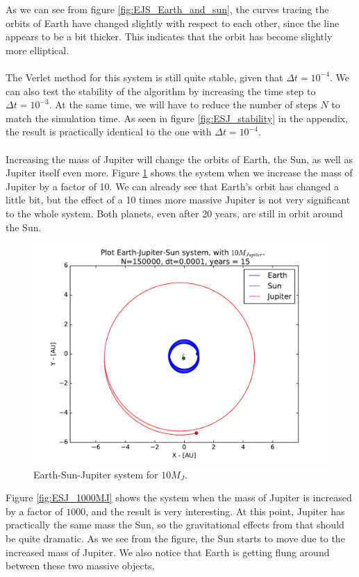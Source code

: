 \documentclass{article}
\begin{document}
As we can see from figure \ref{fig:EJS_Earth_and_sun}, the curves tracing the orbits of Earth have changed slightly with respect to each other, since the line appears to be a bit thicker. This indicates that the orbit has become slightly more elliptical. \\\\
The Verlet method for this system is still quite stable, given that $\Delta t = 10^{-4}$. We can also test the stability of the algorithm by increasing the time step to $\Delta t = 10^{-3}$. At the same time, we will have to reduce the number of steps $N$ to match the simulation time. As seen in figure \ref{fig:ESJ_stability} in the appendix, the result is practically identical to the one with $\Delta t = 10^{-4}$. \\\\
Increasing the mass of Jupiter will change the orbits of Earth, the Sun, as well as Jupiter itself even more. Figure \ref{ESJ_10MJ} shows the system when we increase the mass of Jupiter by a factor of 10. We can already see that Earth's orbit has changed a little bit, but the effect of a 10 times more massive Jupiter is not very significant to the whole system. Both planets, even after 20 years, are still in orbit around the Sun. \\
\begin{figure}[!h]
\centering
\includegraphics[width=\linewidth]{Plots/Earth_Sun_Jupiter_10MJ.pdf}
\caption{Earth-Sun-Jupiter system for $10M_J$.}
\label{ESJ_10MJ}
\end{figure}
Figure \ref{fig:ESJ_1000MJ} shows the system when the mass of Jupiter is increased by a factor of $1000$, and the result is very interesting. At this point, Jupiter has practically the same mass the Sun, so the gravitational effects from that should be quite dramatic. As we see from the figure, the Sun starts to move due to the increased mass of Jupiter. We also notice that Earth is getting flung around between these two massive objects. \\\\
\end{document}

